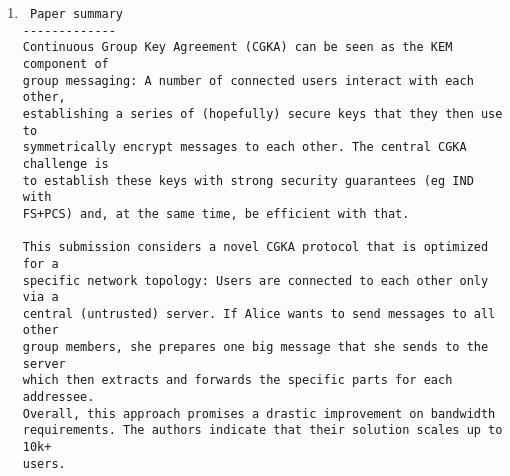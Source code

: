 \documentclass[letterpaper,10pt]{article}
\begin{document}
\begin{enumerate}[label=(\Alph*)]
\begin{verbatim}
However, the organisation is terrible -- to be accepted this paper should include the core construction in the paper.
I would suggest you to reduce Section 3 - 5 or simply move them into supplementary files and spend more space on your core construction in the main body.


Typo:
- 1. [P7] "and if [m : n] := \emptyset if n < m" => "and [m : n] := \emptyset if n < m"
- 2. [P8, Figure 1] "for i in [N] do (eki, dki) <- KG()": remove the arrow above eki
- 3. [P8, Figure 1] "{eki : i in [N] \ Corrupted}" => "{eki : i in [N]} \ Corrupted"
- 4. [P11] "integer weight.Later, it is" => "integer weight. Later, it is" (adding a space)
- 5. [P11, Definition 4] "Vrfy(acc, x, \pi) = 1" => "wVrfy(acc, x, \pi) = 1"
- 6. [P12, Figure 3] "wVrfy(acc, \pi, x) " => "wVrfy(acc, x, \pi) "
- 7. [P18] "The confidentiality and authenticity predicates.generalize ..." => "The confidentiality and authenticity predicates generalize"

Scientific quality
------------------
Q6: The current known CGKA constructions always require high computation efforts, in particular, when the group size is large.
Designing some novel constructions for the high efficiency in the group messaging is definitely a very important open question that is in need of improvement.

Q7: The saCGKA protocol effectively solves the research question. The instantiation SAIK has not only theoretical but also empirical good performance.
For instance, in a group with 10K users, a message transmission requires 1.5MB in TreeKEM but only 2.2KB in their SAIK instantiation.
The only weakness in your construction is the underlying assumption: The Double-Sided Strong Diffie-Hellman (DSSDH) assumption is not a standard assumption.
\end{verbatim}



\item \begin{verbatim} Paper summary
-------------
Continuous Group Key Agreement (CGKA) can be seen as the KEM component of
group messaging: A number of connected users interact with each other,
establishing a series of (hopefully) secure keys that they then use to
symmetrically encrypt messages to each other. The central CGKA challenge is
to establish these keys with strong security guarantees (eg IND with
FS+PCS) and, at the same time, be efficient with that.

This submission considers a novel CGKA protocol that is optimized for a
specific network topology: Users are connected to each other only via a
central (untrusted) server. If Alice wants to send messages to all other
group members, she prepares one big message that she sends to the server
which then extracts and forwards the specific parts for each addressee.
Overall, this approach promises a drastic improvement on bandwidth
requirements. The authors indicate that their solution scales up to 10k+
users.


\end{verbatim}
\end{enumerate}
\end{document}
